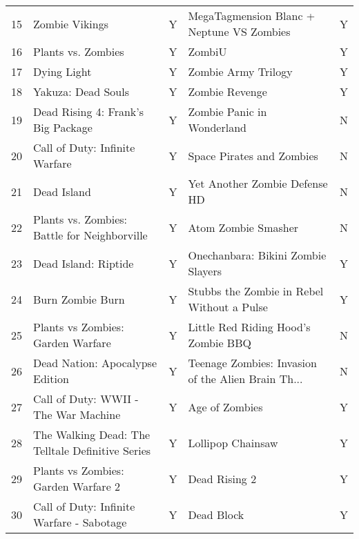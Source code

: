 \begin{tabular}{rllll}
   15 &                                   Zombie Vikings &         Y &          MegaTagmension Blanc + Neptune VS Zombies &         Y \\
   16 &                               Plants vs. Zombies &         Y &                                             ZombiU &         Y \\
   17 &                                      Dying Light &         Y &                                Zombie Army Trilogy &         Y \\
   18 &                               Yakuza: Dead Souls &         Y &                                     Zombie Revenge &         Y \\
   19 &               Dead Rising 4: Frank's Big Package &         Y &                         Zombie Panic in Wonderland &         N \\
   20 &                   Call of Duty: Infinite Warfare &         Y &                          Space Pirates and Zombies &         N \\
   21 &                                      Dead Island &         Y &                      Yet Another Zombie Defense HD &         N \\
   22 &     Plants vs. Zombies: Battle for Neighborville &         Y &                                Atom Zombie Smasher &         N \\
   23 &                             Dead Island: Riptide &         Y &                 Onechanbara: Bikini Zombie Slayers &         Y \\
   24 &                                 Burn Zombie Burn &         Y &         Stubbs the Zombie in Rebel Without a Pulse &         Y \\
   25 &                Plants vs Zombies: Garden Warfare &         Y &                Little Red Riding Hood's Zombie BBQ &         N \\
   26 &                  Dead Nation: Apocalypse Edition &         Y & Teenage Zombies: Invasion of the Alien Brain Th... &         N \\
   27 &             Call of Duty: WWII - The War Machine &         Y &                                     Age of Zombies &         Y \\
   28 & The Walking Dead: The Telltale Definitive Series &         Y &                                  Lollipop Chainsaw &         Y \\
   29 &              Plants vs Zombies: Garden Warfare 2 &         Y &                                      Dead Rising 2 &         Y \\
   30 &        Call of Duty: Infinite Warfare - Sabotage &         Y &                                         Dead Block &         Y \\
\bottomrule
\end{tabular}
